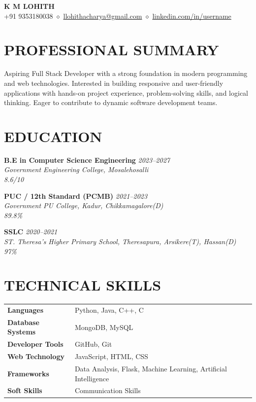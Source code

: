 \documentclass[9.5pt,a4paper]{extarticle}
\begin{document}
\begin{center}
{\Large \textbf{K M LOHITH}} \\ \vspace{2pt}
+91 9353180038 $\diamond$ \href{mailto:llohithacharya@gmail.com}{llohithacharya@gmail.com} $\diamond$ \href{https://linkedin.com/in/username}{linkedin.com/in/username}
\end{center}

\section*{PROFESSIONAL SUMMARY}
Aspiring Full Stack Developer with a strong foundation in modern programming and web technologies. Interested in building responsive and user-friendly applications with hands-on project experience, problem-solving skills, and logical thinking. Eager to contribute to dynamic software development teams.

\section*{EDUCATION}
\noindent \textbf{B.E in Computer Science Engineering} \hfill \textit{2023–2027} \\
\textit{Government Engineering College, Mosalehosalli} \\
\textit{8.6/10} \vspace{4pt}

\noindent \textbf{PUC / 12th Standard (PCMB)} \hfill \textit{2021–2023} \\
\textit{Government PU College, Kadur, Chikkamagalore(D)} \\
\textit{89.8\%} \vspace{4pt}

\noindent \textbf{SSLC} \hfill \textit{2020–2021} \\
\textit{ST. Theresa’s Higher Primary School, Theresapura, Arsikere(T), Hassan(D)} \\
\textit{97\%} \vspace{4pt}


\section*{TECHNICAL SKILLS}
\begin{tabular}{@{}p{1.5in}p{5.4in}@{}}
\textbf{Languages} & Python, Java, C++, C \\
\textbf{Database Systems} & MongoDB, MySQL \\
\textbf{Developer Tools} & GitHub, Git \\
\textbf{Web Technology} & JavaScript, HTML, CSS \\
\textbf{Frameworks} & Data Analysis, Flask, Machine Learning, Artificial Intelligence \\
\textbf{Soft Skills} & Communication Skills \\
\end{tabular}
\end{document}
